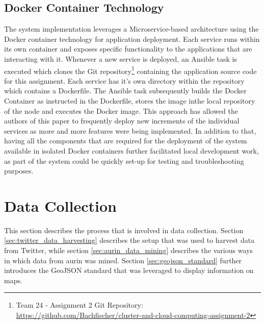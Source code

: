\documentclass[11pt, oneside]{article}
\begin{document}
\subsection{Docker Container Technology}
The system implementation leverages a Microservice-based architecture using the Docker container technology for application deployment. Each service runs within its own container and exposes specific functionality to the applications that are interacting with it. 
\newline
Whenever a new service is deployed, an Ansible task is executed which clones the Git repository\footnote{Team 24 - Assignment 2 Git Repository: \url{https://github.com/Bachfischer/cluster-and-cloud-computing-assignment-2}} containing the application source code for this assignment. Each service has it's own directory within the repository which contains a Dockerfile. The Ansible task subsequently builds the Docker Container as instructed in the Dockerfile, stores the image inthe local repository of the node and executes the Docker image. 
\newline
This approach has allowed the authors of this paper to frequently deploy new increments of the individual services as more and more features were being implemented. In addition to that, having all the components that are required for the deployment of the system available in isolated Docker containers further facilitated local development work, as part of the system could be quickly set-up for testing and troubleshooting purposes.


\section{Data Collection}
\label{sec:data_collection}
This section describes the process that is involved in data collection. Section \ref{sec:twitter_data_harvesting} describes the setup that was used to harvest data from Twitter, while section \ref{sec:aurin_data_mining} describes the various ways in which data from \acrshort{aurin} was mined. Section \ref{sec:geojson_standard} further introduces the GeoJSON standard that was leveraged to display information on maps.
\end{document}
